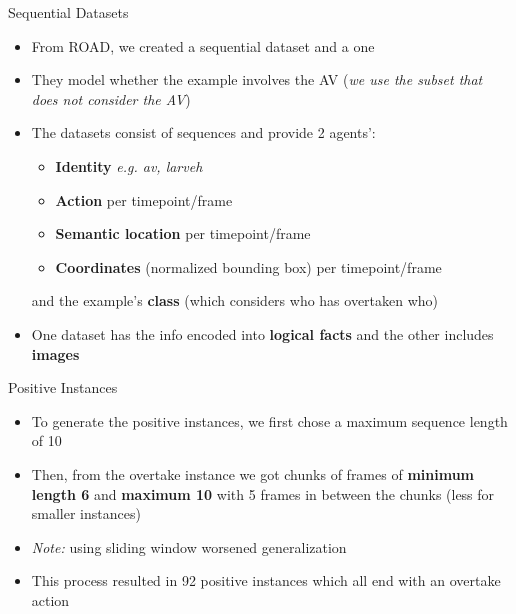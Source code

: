 \documentclass[10pt, aspectratio=169]{beamer}
\begin{document}
\begin{frame}{Sequential Datasets}
    \begin{itemize}
        \setlength{\itemsep}{12pt}
        \item  From ROAD, we created a  sequential dataset and a  one 
        \item  They model whether the example involves the AV (\textit{we use the subset that does not consider the AV}) %
        \item The datasets consist of sequences  and provide \textcolor{umBlueLighter}{2 agents'}:
        \vspace{6pt}
        \begin{itemize}
            \setlength{\itemsep}{3pt}
            \item \textbf{Identity} \textit{e.g. av, larveh}
            \item \textbf{Action} per timepoint/frame
            \item \textbf{Semantic location} per timepoint/frame
            \item \textbf{Coordinates} (normalized bounding box) per timepoint/frame
        \end{itemize}
        \vspace{6pt}
        and the example's \textbf{class} (which considers who has overtaken who)
        \item One dataset has the info encoded into \textbf{logical facts} and the other includes \textbf{images}
    \end{itemize}
\end{frame}



\begin{frame}{Positive Instances}
    \begin{itemize}
        \setlength{\itemsep}{13pt}
        \item To generate the positive instances, we first chose a  maximum sequence length of 10
        \item Then, from the overtake instance we got chunks of frames of \textbf{minimum length 6} and\textbf{ maximum 10} with 5 frames in between the chunks (less for smaller instances) 
        \item \textit{Note:} using sliding window worsened generalization
        \item This process resulted in \textcolor{umBlueLighter}{92 positive instances}  which all end with an overtake action
    \end{itemize}
\end{frame}
\end{document}
